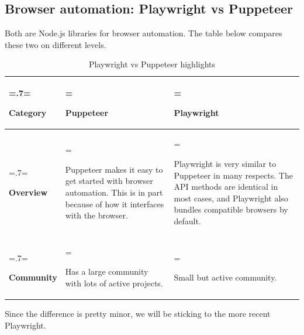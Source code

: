 \subsection{Browser automation: Playwright vs Puppeteer}
Both are Node.js libraries for browser automation. The table below compares these two on different levels.
\begin{table}[H]
	\renewcommand{\arraystretch}{1.5}%
	\caption{Playwright vs Puppeteer highlights}
	\centering
	\medskip
	\begin{tabularx}{1\textwidth} {
			| >{\hsize=.7\hsize\linewidth=\hsize\raggedright\arraybackslash}X
			| >{\hsize=1.15\hsize\linewidth=\hsize\raggedright\arraybackslash}X
			| >{\hsize=1.15\hsize\linewidth=\hsize\raggedright\arraybackslash}X |}
		\hline
		\rowcolor{primary} \textbf {Category} & \textbf {Puppeteer}                                                                                                            & \textbf {Playwright}                                                                                                                                               \\
		\hline
		\textbf {Overview}                    & Puppeteer makes it easy to get started with browser automation. This is in part because of how it interfaces with the browser. & Playwright is very similar to Puppeteer in many respects. The API methods are identical in most cases, and Playwright also bundles compatible browsers by default. \\
		\hline
		\textbf {Community}                   & Has a large community with lots of active projects.                                                                            & Small but active community.                                                                                                                                        \\
		\hline
	\end{tabularx}
\end{table}
Since the difference is pretty minor, we will be sticking to the more recent Playwright.

